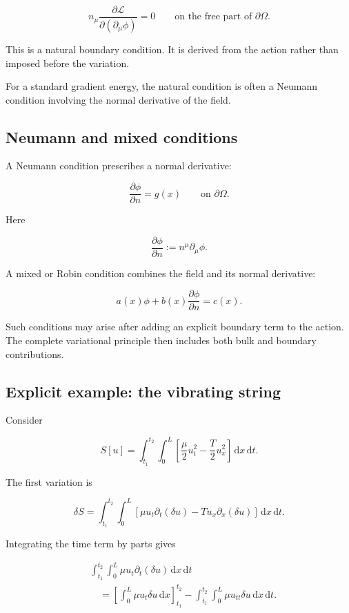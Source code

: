 \[
\boxed{
 n_{\mu}
\frac{\partial\mathcal{L}}
{\partial(\partial_{\mu}\phi)}
=0
\qquad
\text{on the free part of }\partial\Omega
}.
\]

This is a natural boundary condition. It is derived from the action rather than imposed before the variation.

For a standard gradient energy, the natural condition is often a Neumann condition involving the normal derivative of the field.

\subsection{Neumann and mixed conditions}

A Neumann condition prescribes a normal derivative:

\[
\frac{\partial\phi}{\partial n}
=
g(x)
\qquad
\text{on }\partial\Omega.
\]

Here

\[
\frac{\partial\phi}{\partial n}
:=
n^{\mu}\partial_{\mu}\phi.
\]

A mixed or Robin condition combines the field and its normal derivative:

\[
a(x)\phi
+
b(x)\frac{\partial\phi}{\partial n}
=
c(x).
\]

Such conditions may arise after adding an explicit boundary term to the action. The complete variational principle then includes both bulk and boundary contributions.

\subsection{Explicit example: the vibrating string}

Consider

\[
S[u]
=
\int_{t_{1}}^{t_{2}}
\int_{0}^{L}
\left[
\frac{\mu}{2}u_{t}^{2}
-
\frac{T}{2}u_{x}^{2}
\right]
\,\mathrm{d}x\,\mathrm{d}t.
\]

The first variation is

\[
\delta S
=
\int_{t_{1}}^{t_{2}}
\int_{0}^{L}
\left[
\mu u_{t}\partial_{t}(\delta u)
-
T u_{x}\partial_{x}(\delta u)
\right]
\,\mathrm{d}x\,\mathrm{d}t.
\]

Integrating the time term by parts gives

\[
\begin{aligned}
&\int_{t_{1}}^{t_{2}}
\int_{0}^{L}
\mu u_{t}\partial_{t}(\delta u)
\,\mathrm{d}x\,\mathrm{d}t\\
&\quad=
\left[
\int_{0}^{L}
\mu u_{t}\delta u
\,\mathrm{d}x
\right]_{t_{1}}^{t_{2}}
-
\int_{t_{1}}^{t_{2}}
\int_{0}^{L}
\mu u_{tt}\delta u
\,\mathrm{d}x\,\mathrm{d}t.
\end{aligned}
\]

